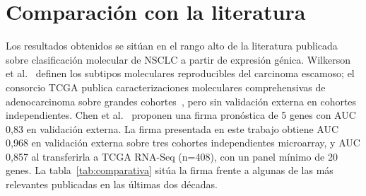 \section{Comparación con la literatura}
\label{sec:disc_literatura}

Los resultados obtenidos se sitúan en el rango alto de la literatura
publicada sobre clasificación molecular de NSCLC a partir de expresión
génica. Wilkerson et al.~\cite{wilkerson2010lusc} definen los subtipos
moleculares reproducibles del carcinoma escamoso; el consorcio TCGA
publica caracterizaciones moleculares comprehensivas de adenocarcinoma
sobre grandes cohortes~\cite{tcga2014luad}, pero sin validación externa
en cohortes independientes. Chen et al.~\cite{chen2017gene} proponen una
firma pronóstica de 5 genes con AUC 0,83 en validación externa. La firma
presentada en este trabajo obtiene AUC 0,968 en validación externa sobre
tres cohortes independientes microarray, y AUC 0,857 al transferirla a
TCGA RNA-Seq (n=408), con un panel mínimo de 20 genes.
La tabla~\ref{tab:comparativa} sitúa la firma frente a algunas de las más
relevantes publicadas en las últimas dos décadas.

